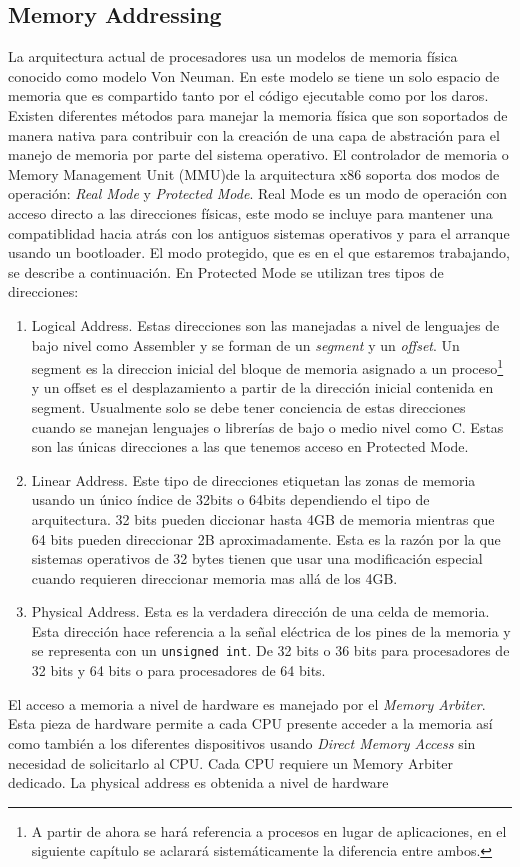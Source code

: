 \subsection{Memory Addressing} 
La arquitectura actual de procesadores usa un modelos de memoria física
conocido como modelo Von Neuman. En este modelo se tiene un solo espacio de
memoria que es compartido tanto por el código ejecutable como por los
daros. Existen diferentes métodos para manejar la memoria física que son
soportados de manera nativa para contribuir con la creación de una capa de
abstración para el manejo de memoria por parte del sistema operativo. El
controlador de memoria o Memory Management Unit (MMU)de la arquitectura x86
soporta dos modos de operación: \emph{Real Mode} y \emph{Protected Mode}.  Real
Mode es un modo de operación con acceso directo a las direcciones físicas, este
modo se incluye para mantener una compatiblidad hacia atrás con los antiguos
sistemas operativos y para el arranque usando un bootloader. El modo protegido,
que es en el que estaremos trabajando, se describe a continuación.  En
Protected Mode se utilizan tres tipos de direcciones:
\begin{enumerate}
\item Logical Address. Estas direcciones son las manejadas a nivel de lenguajes
  de bajo nivel como Assembler y se forman de un \emph{segment} y un
  \emph{offset}. Un segment es la direccion inicial del bloque de memoria
  asignado a un proceso\footnote{A partir de ahora se hará referencia a
    procesos en lugar de aplicaciones, en el siguiente capítulo se aclarará
    sistemáticamente la diferencia entre ambos.} y un offset es el
  desplazamiento a partir de la dirección inicial contenida en
  segment. Usualmente solo se debe tener conciencia de estas direcciones cuando
  se manejan lenguajes o librerías de bajo o medio nivel como C. Estas son las
  únicas direcciones a las que tenemos acceso en Protected Mode.
\item Linear Address. Este tipo de direcciones etiquetan las zonas de memoria
  usando un único índice de 32bits o 64bits dependiendo el tipo de
  arquitectura. 32 bits pueden diccionar hasta 4GB de memoria mientras que 64
  bits pueden direccionar 2B aproximadamente. Esta es la razón por la que
  sistemas operativos de 32 bytes tienen que usar una modificación especial
  cuando requieren direccionar memoria mas allá de los 4GB.
\item Physical Address. Esta es la verdadera dirección de una celda de
  memoria. Esta dirección hace referencia a la señal eléctrica de los pines de
  la memoria y se representa con un \texttt{unsigned int}. De 32 bits o 36 bits
  para procesadores de 32 bits y 64 bits o para procesadores de 64 bits.
\end{enumerate} El acceso a memoria a nivel de hardware es manejado por el
\emph{Memory Arbiter}. Esta pieza de hardware permite a cada CPU presente
acceder a la memoria así como también a los diferentes dispositivos usando
\emph{Direct Memory Access} sin necesidad de solicitarlo al CPU. Cada CPU
requiere un Memory Arbiter dedicado.  La physical address es obtenida a nivel
de hardware


